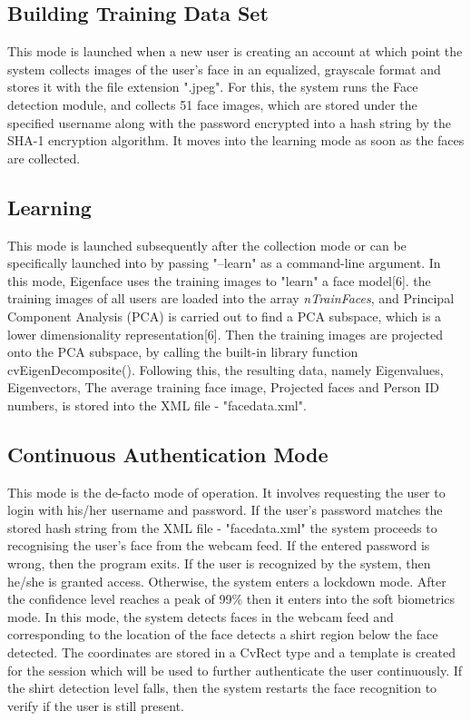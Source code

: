 \documentclass[12pt]{article}			%
\begin{document}
\subsection { Building Training Data Set }
This mode is launched when a new user is creating an account at which point the system collects images of the user's face in an equalized, grayscale format and stores it with the file extension ".jpeg". For this, the system runs the Face detection module, and collects 51 face images, which are stored under the specified username along with the password encrypted into a hash string by the SHA-1 encryption algorithm. It moves into the learning mode as soon as the faces are collected. 
\subsection { Learning }
This mode is launched subsequently after the collection mode or can be specifically launched into by passing "--learn" as a command-line argument. In this mode, Eigenface uses the training images to "learn" a face model[6]. the training images of all users are loaded into the array \emph {nTrainFaces}, and Principal Component Analysis (PCA) is carried out to find a PCA subspace, which is a lower dimensionality representation[6]. Then the training images are projected onto the PCA subspace, by calling the built-in library function cvEigenDecomposite(). Following this, the resulting data, namely Eigenvalues, Eigenvectors, The average training face image, Projected faces and Person ID numbers, is stored into the XML file - "facedata.xml".    
\subsection { Continuous Authentication Mode }
This mode is the de-facto mode of operation. It involves requesting the user to login with his/her username and password. If the user's password matches the stored hash string from the XML file - "facedata.xml" the system proceeds to recognising the user's face from the webcam feed. If the entered password is wrong, then the program exits. If the user is recognized by the system, then he/she is granted access. Otherwise, the system enters a lockdown mode. After the confidence level reaches a peak of 99\% then it enters into the soft biometrics mode. In this mode, the system detects faces in the webcam feed and corresponding to the location of the face detects a shirt region below the face detected. The coordinates are stored in a CvRect type and a template is created for the session which will be used to further authenticate the user continuously. If the shirt detection level falls, then the system restarts the face recognition to verify if the user is still present.  
\end{document}
